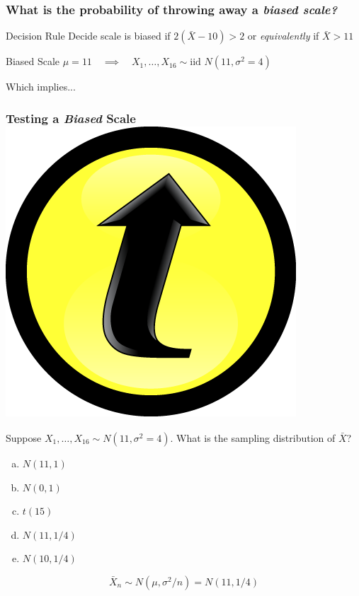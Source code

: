 \documentclass[handout]{beamer}
\begin{document}
\begin{frame}
	\frametitle{What is the probability of throwing away a \em{biased} scale?}

	\begin{block}
		{Decision Rule}
		Decide scale is biased if $2(\bar{X} - 10) > 2$ or \emph{equivalently} if \alert{$\bar{X} > 11$} 
	\end{block}
	\begin{block}
		{Biased Scale}
		$\mu = 11 \quad \implies \quad X_1, \hdots, X_{16} \sim \mbox{iid } N(11, \sigma^2 = 4)$
	\end{block}
	\begin{alertblock}
		{Which implies...}
	\end{alertblock}
\end{frame}
\begin{frame}
	\frametitle{Testing a \emph{Biased} Scale\hfill \includegraphics[scale = 0.05]{./images/clicker}}

	Suppose $X_1, \hdots, X_{16} \sim N(11, \sigma^2 = 4)$. What is the sampling distribution of $\bar{X}$?
	
	\vspace{1em}

	\begin{enumerate}[(a)]
		\item $N(11, 1)$
		\item $N(0, 1)$ 
		\item $t(15)$
		\item $N(11, 1/4)$ 
		\item $N(10, 1/4)$
	\end{enumerate}
\pause

\vspace{1em}

\alert{$$\bar{X}_n \sim N(\mu, \sigma^2/n) = N(11, 1/4)$$}
\end{frame}
\end{document}

